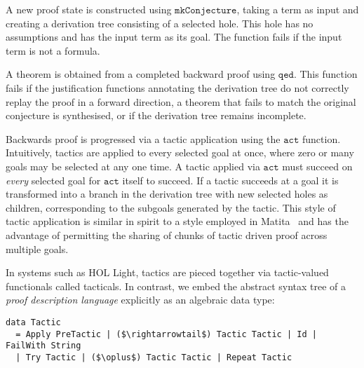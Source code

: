 \documentclass{llncs}
\begin{document}
A new proof state is constructed using $\mathtt{mkConjecture}$, taking a term as input and creating a derivation tree consisting of a selected hole.
This hole has no assumptions and has the input term as its goal.
The function fails if the input term is not a formula.

A theorem is obtained from a completed backward proof using $\mathtt{qed}$.
This function fails if the justification functions annotating the derivation tree do not correctly replay the proof in a forward direction, a theorem that fails to match the original conjecture is synthesised, or if the derivation tree remains incomplete.

Backwards proof is progressed via a tactic application using the $\mathtt{act}$ function.
Intuitively, tactics are applied to every selected goal at once, where zero or many goals may be selected at any one time.
A tactic applied via $\mathtt{act}$ must succeed on \emph{every} selected goal for $\mathtt{act}$ itself to succeed.
If a tactic succeeds at a goal it is transformed into a branch in the derivation tree with new selected holes as children, corresponding to the subgoals generated by the tactic.
This style of tactic application is similar in spirit to a style employed in Matita~\cite{asperti:matita:2011} and has the advantage of permitting the sharing of chunks of tactic driven proof across multiple goals.

In systems such as HOL Light, tactics are pieced together via tactic-valued functionals called tacticals.
In contrast, we embed the abstract syntax tree of a \emph{proof description language} explicitly as an algebraic data type:
\begin{lstlisting}
data Tactic
  = Apply PreTactic | ($\rightarrowtail$) Tactic Tactic | Id | FailWith String
  | Try Tactic | ($\oplus$) Tactic Tactic | Repeat Tactic
\end{lstlisting}
\end{document}
